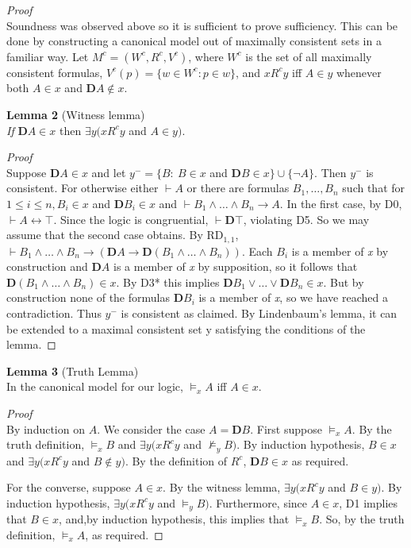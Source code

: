 \documentclass[
  10pt,
  letterpaper,
  DIV=11,
  numbers=noendperiod,
  twoside]{scrartcl}
\begin{document}
\emph{Proof}\\
Soundness was observed above so it is sufficient to prove sufficiency.
This can be done by constructing a canonical model out of maximally
consistent sets in a familiar way. Let \(M^c=(W^c\!, R^c\!,V^c)\), where
\(W^c\) is the set of all maximally consistent formulas,
\(V^c(p)=\{w{\in}W^c\!: p{\in}w\}\), and \(xR^cy\) iff \(A{\in}y\)
whenever both \(A{\in}x\) and \(\mathbf{D}A{\notin}x\).

\textbf{Lemma 2} (Witness lemma)\\
\emph{If} \(\mathbf{D}A{\in}x\) then \(\exists y (xR^cy\) and
\(A{\in}y)\).

\emph{Proof}\\
Suppose \(\mathbf{D}A {\in}x\) and let \(y^- = \{B{:}~ B{\in}x\) and
\(\mathbf{D}B{\in}x\}\cup\{\neg A\}\). Then \(y^-\) is consistent. For
otherwise either \(\vdash A\) or there are formulas \(B_1,{\ldots},B_n\)
such that for \(1\le i\le n, B_i{\in}x\) and \(\mathbf{D}B_i{\in}x\) and
\(\vdash B_1\wedge {\ldots}\wedge B_n\rightarrow A\). In the first case,
by D0, \(\vdash A{\leftrightarrow}\top\). Since the logic is
congruential, \(\vdash \mathbf{D}\top\), violating D5. So we may assume
that the second case obtains. By RD\(_{1,1}\),
\(\vdash B_1\wedge {\ldots}\wedge B_n\rightarrow (\mathbf{D}A\rightarrow \mathbf{D}(B_1\wedge {\ldots}\wedge B_n))\).
Each \(B_i\) is a member of \emph{x} by construction and \(\mathbf{D}A\)
is a member of \emph{x} by supposition, so it follows that
\(\mathbf{D}(B_1\wedge {\ldots}\wedge B_n){\in}x\). By D3* this implies
\(\mathbf{D}B_1\vee {\ldots}\vee \mathbf{D}B_n \in x\). But by
construction none of the formulas \(\mathbf{D}B_i\) is a member of
\emph{x}, so we have reached a contradiction. Thus \(y^-\) is consistent
as claimed. By Lindenbaum's lemma, it can be extended to a maximal
consistent set y satisfying the conditions of the lemma.~◻

\textbf{Lemma 3} (Truth Lemma)\\
In the canonical model for our logic, \(\models _x A\) iff \(A{\in}x\).

\emph{Proof}\\
By induction on \(A\). We consider the case \(A=\mathbf{D}B\). First
suppose \(\models _x A\). By the truth definition, \(\models _x B\) and
\(\exists y (xR^cy\) and \({\nvDash_y}B)\). By induction hypothesis,
\(B{\in}x\) and \(\exists y (xR^cy\) and \(B{\notin}y)\). By the
definition of \(R^c\), \(\mathbf{D}B{\in}x\) as required.

For the converse, suppose \(A{\in}x\). By the witness lemma,
\(\exists y (xR^cy\) and \(B{\in}y)\). By induction hypothesis,
\(\exists y( xR^cy\) and \({\models_y}B)\). Furthermore, since
\(A{\in}x\), D1 implies that \(B{\in}x\), and,by induction hypothesis,
this implies that \(\models _x B\). So, by the truth definition,
\(\models _x A\), as required.~◻
\end{document}
